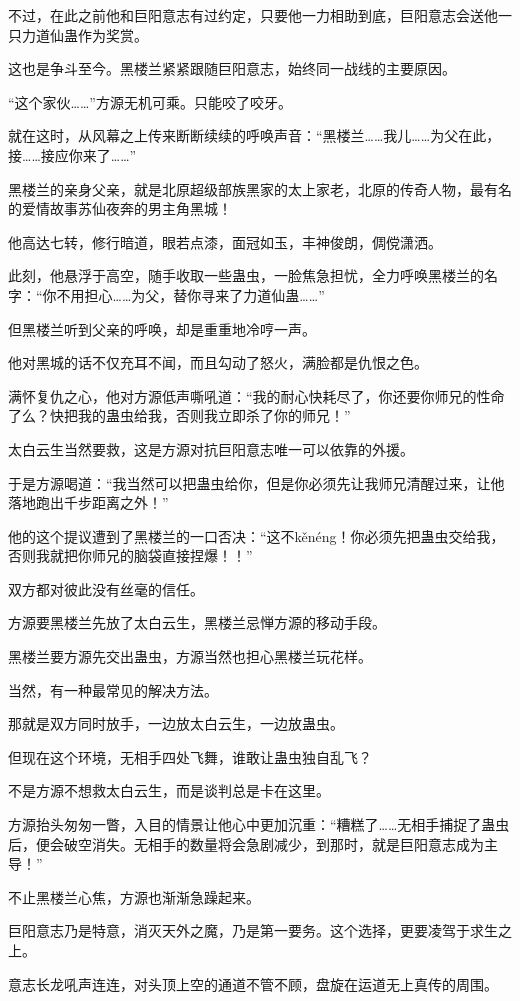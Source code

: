 \begin{this_body}
不过，在此之前他和巨阳意志有过约定，只要他一力相助到底，巨阳意志会送他一只力道仙蛊作为奖赏。

这也是争斗至今。黑楼兰紧紧跟随巨阳意志，始终同一战线的主要原因。

“这个家伙……”方源无机可乘。只能咬了咬牙。

就在这时，从风幕之上传来断断续续的呼唤声音：“黑楼兰……我儿……为父在此，接……接应你来了……”

黑楼兰的亲身父亲，就是北原超级部族黑家的太上家老，北原的传奇人物，最有名的爱情故事苏仙夜奔的男主角黑城！

他高达七转，修行暗道，眼若点漆，面冠如玉，丰神俊朗，倜傥潇洒。

此刻，他悬浮于高空，随手收取一些蛊虫，一脸焦急担忧，全力呼唤黑楼兰的名字：“你不用担心……为父，替你寻来了力道仙蛊……”

但黑楼兰听到父亲的呼唤，却是重重地冷哼一声。

他对黑城的话不仅充耳不闻，而且勾动了怒火，满脸都是仇恨之色。

满怀复仇之心，他对方源低声嘶吼道：“我的耐心快耗尽了，你还要你师兄的性命了么？快把我的蛊虫给我，否则我立即杀了你的师兄！”

太白云生当然要救，这是方源对抗巨阳意志唯一可以依靠的外援。

于是方源喝道：“我当然可以把蛊虫给你，但是你必须先让我师兄清醒过来，让他落地跑出千步距离之外！”

他的这个提议遭到了黑楼兰的一口否决：“这不kěnéng！你必须先把蛊虫交给我，否则我就把你师兄的脑袋直接捏爆！！”

双方都对彼此没有丝毫的信任。

方源要黑楼兰先放了太白云生，黑楼兰忌惮方源的移动手段。

黑楼兰要方源先交出蛊虫，方源当然也担心黑楼兰玩花样。

当然，有一种最常见的解决方法。

那就是双方同时放手，一边放太白云生，一边放蛊虫。

但现在这个环境，无相手四处飞舞，谁敢让蛊虫独自乱飞？

不是方源不想救太白云生，而是谈判总是卡在这里。

方源抬头匆匆一瞥，入目的情景让他心中更加沉重：“糟糕了……无相手捕捉了蛊虫后，便会破空消失。无相手的数量将会急剧减少，到那时，就是巨阳意志成为主导！”

不止黑楼兰心焦，方源也渐渐急躁起来。

巨阳意志乃是特意，消灭天外之魔，乃是第一要务。这个选择，更要凌驾于求生之上。

意志长龙吼声连连，对头顶上空的通道不管不顾，盘旋在运道无上真传的周围。


\end{this_body}
